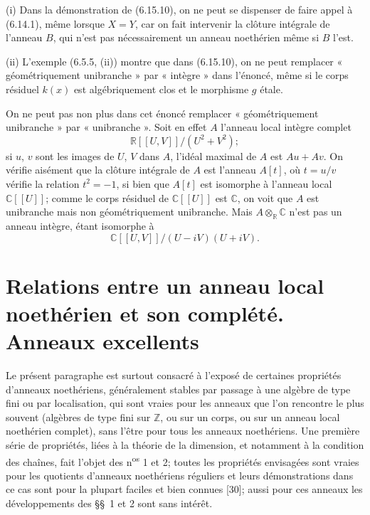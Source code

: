\begin{remarks}[6.15.11]
\label{IV.2.s6.15.11-fr}
(i) Dans la démonstration de (6.15.10), on ne peut se dispenser de faire
appel à (6.14.1), même lorsque $X=Y$, car on fait intervenir la clôture
intégrale de l'anneau $B$, qui n'est pas nécessairement un anneau
noethérien même si $B$ l'est.

(ii) L'exemple (6.5.5, (ii)) montre que dans (6.15.10), on ne peut remplacer
« géométriquement unibranche » par « intègre » dans l'énoncé, même si
le corps résiduel $k(x)$ est algébriquement clos et le morphisme $g$ étale.

On ne peut pas non plus dans cet énoncé remplacer « géométriquement
unibranche » par « unibranche ». Soit en effet $A$ l'anneau local intègre
complet
\[
\mathbb R[[U,V]]/(U^2+V^2);
\]
si $u$, $v$ sont les images de $U$, $V$ dans $A$, l'idéal maximal de $A$
est $Au+Av$. On vérifie aisément que la clôture intégrale de $A$ est
l'anneau $A[t]$, où $t=u/v$ vérifie la relation $t^2=-1$, si bien que
$A[t]$ est isomorphe à l'anneau local $\mathbb C[[U]]$; comme le corps
résiduel de $\mathbb C[[U]]$ est $\mathbb C$, on voit que $A$ est
unibranche mais non géométriquement unibranche. Mais
$A\otimes_{\mathbb R}\mathbb C$ n'est pas un anneau intègre, étant
isomorphe à
\[
\mathbb C[[U,V]]/(U-iV)(U+iV).
\]
\end{remarks}

\section{Relations entre un anneau local noethérien et son complété. Anneaux excellents}
\label{section:IV.7-fr}

Le présent paragraphe est surtout consacré à l'exposé de certaines propriétés
d'anneaux noethériens, généralement stables par passage à une algèbre de type
fini ou par localisation, qui sont vraies pour les anneaux que l'on rencontre
le plus souvent (algèbres de type fini sur $\mathbb Z$, ou sur un corps, ou sur
un anneau local noethérien complet), sans l'être pour tous les anneaux
noethériens. Une première série de propriétés, liées à la théorie de la
dimension, et notamment à la condition des chaînes, fait l'objet des
n\textsuperscript{os} 1 et
2; toutes les propriétés envisagées sont vraies pour les quotients d'anneaux
noethériens réguliers et leurs démonstrations dans ce cas sont pour la plupart
faciles et bien connues [30]; aussi pour ces anneaux les développements des
\S\S~1 et 2 sont sans intérêt.

